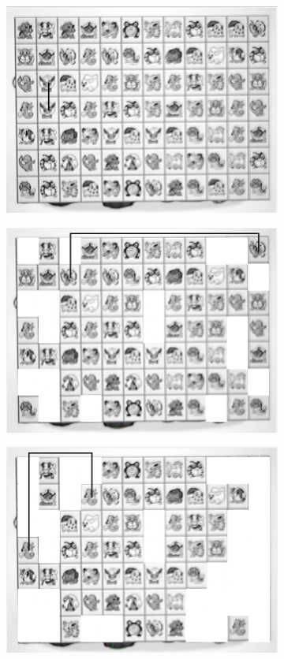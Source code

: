 \documentclass{article}
\numberwithin{figure}{section}
\numberwithin{table}{section}
\numberwithin{listing}{section}
\numberwithin{equation}{section}
\begin{document}
\begin{enumerate}
                \begin{figure}[H]
                    \centering
                    \begin{subfigure}{0.5\textwidth}
                        \centering
                        \includegraphics[width=0.77\linewidth]{mocklink1}
                    \end{subfigure}%
                    \begin{subfigure}{0.5\textwidth}
                        \centering
                        \includegraphics[width=0.77\linewidth]{mocklink2}
                    \end{subfigure}
                    \begin{subfigure}{0.5\textwidth}
                        \centering
                        \includegraphics[width=0.77\linewidth]{mocklink3}

\end{subfigure}
\end{figure}
\end{enumerate}
\end{document}

